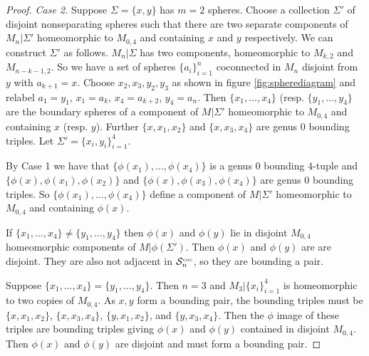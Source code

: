 \documentclass[11pt]{article}
\newcommand{\coc}[1]{{\ensuremath{ \mathcal S^{\mbox{\tiny{coc}}}_{#1} }}}
\begin{document}
\begin{proof}
\medskip \noindent \emph{Case 2.} Suppose $\Sigma=\{x,y\}$ has $m=2$ spheres.
Choose a collection $\Sigma'$ of disjoint nonseparating spheres such that  there are two separate components of $M_n|\Sigma'$ homeomorphic to $M_{0,4}$ and containing $x$ and $y$ respectively.
We can construct $\Sigma'$ as follows.
$M_n|\Sigma$ has two components, homeomorphic to $M_{k,2}$ and $M_{n-k-1,2}$.
So we have a set of spheres $\{a_i\}_{i=1}^n$ coconnected in $M_n$ disjoint from $y$ with $a_{k+1}=x$.
Choose $x_2,x_3,y_2,y_3$ as shown in figure \ref{fig:spherediagram} and relabel $a_1=y_1$, $x_{1}=a_k$, $x_4=a_{k+2}$, $y_4=a_n$. 
Then 
$\{x_1,\ldots, x_4\}$ (resp. $\{y_1, \ldots, y_4\}$ are the boundary spheres of a component of $M|\Sigma'$ homeomorphic to $M_{0,4}$ and containing $x$ (resp. $y$).
Further $\{x,x_1,x_2\}$ and $\{x,x_3,x_4\}$ are genus 0 bounding triples. Let $\Sigma' =\{x_i,y_i\}_{i=1}^4$.



By Case 1 we have that $\{\phi(x_1), \ldots, \phi(x_4)\}$ is a genus 0 bounding $4$-tuple and $\{\phi(x),\phi(x_1),\phi(x_2)\}$ and $\{\phi(x),\phi(x_3),\phi(x_4)\}$ are genus 0 bounding triples. 
So $\{\phi(x_1), \ldots, \phi(x_4)\}$ define a component of $M|\Sigma'$ homeomorphic to $M_{0,4}$ and containing $\phi(x)$.

If $\{x_1, \ldots, x_4\} \neq \{y_1, \ldots, y_4\}$ then 
 $\phi(x)$ and $\phi(y)$ lie in disjoint $M_{0,4}$ homeomorphic components of $M|\phi(\Sigma')$.
Then  $\phi(x)$ and $\phi(y)$ are are disjoint. They are also not adjacent in $\coc n$, so they are bounding a pair.

Suppose $\{x_1, \ldots, x_4\} = \{y_1, \ldots, y_4\}$.
Then $n=3$ and $M_3|\{x_i\}_{i=1}^4$ is homeomorphic to two copies of $M_{0,4}$.
As $x,y$ form a bounding pair, the bounding triples must be
$\{x,x_1,x_2\}$, $\{x,x_3,x_4\}$, $\{y,x_1,x_2\}$, and $\{y,x_3,x_4\}$.
Then the $\phi$ image of these triples are
bounding triples giving $\phi(x)$ and $\phi(y)$ contained in disjoint $M_{0,4}$.
Then $\phi(x)$ and $\phi(y)$ are disjoint and must form a bounding pair.
\end{proof}


{}

\end{document}
